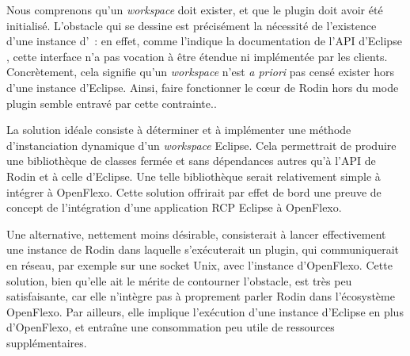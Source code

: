 Nous comprenons qu'un \textit{workspace} doit exister, et que le plugin  doit avoir été initialisé.
L'obstacle qui se dessine est précisément la nécessité de l'existence d'une instance d'~: en effet, comme l'indique la documentation %
de l'API d'Eclipse \cite{eclipseiworkspace}, cette interface n'a pas vocation à être étendue ni implémentée par les clients.
Concrètement, cela signifie qu'un \textit{workspace} n'est \textit{a priori} pas censé exister hors d'une instance d'Eclipse.
Ainsi, faire fonctionner le cœur de Rodin hors du mode plugin semble entravé par cette contrainte..

La solution idéale consiste à déterminer et à implémenter une méthode d'instanciation dynamique d'un \textit{workspace} Eclipse.
Cela permettrait de produire une bibliothèque de classes fermée et sans dépendances autres qu'à l'API de Rodin et à celle d'Eclipse.
Une telle bibliothèque serait relativement simple à intégrer à OpenFlexo.
Cette solution offrirait par effet de bord une preuve de concept de l'intégration d'une application RCP Eclipse à OpenFlexo.

Une alternative, nettement moins désirable, consisterait à lancer effectivement une instance de Rodin dans laquelle s'exécuterait un plugin, qui communiquerait %
en réseau, par exemple sur une socket Unix, avec l'instance d'OpenFlexo.
Cette solution, bien qu'elle ait le mérite de contourner l'obstacle, est très peu satisfaisante, car elle n'intègre pas à proprement parler Rodin dans l'écosystème OpenFlexo.
Par ailleurs, elle implique l'exécution d'une instance d'Eclipse en plus d'OpenFlexo, et entraîne une consommation peu utile de ressources supplémentaires.

